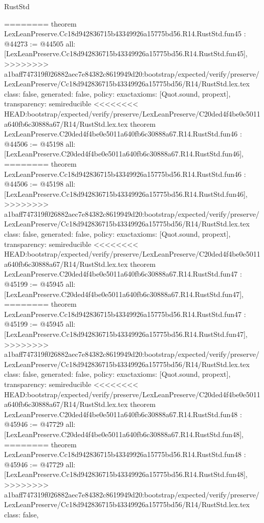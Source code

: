 \begin{lexlean}{RustStd}
\begin{coremodule}
{\begin{coremodule}
{{{{{{{{{{{{{{{{{{{{{{{{{{{{{{{{{{{{{{{{{{{{{{{{========
theorem LexLeanPreserve.Cc18d942836715b43349926a15775bd56.R14.RustStd.fun45 : @44273 := @44505 {
  all: [LexLeanPreserve.Cc18d942836715b43349926a15775bd56.R14.RustStd.fun45],
>>>>>>>> a1baff747319f026882aec7e84382c8619949d20:bootstrap/expected/verify/preserve/LexLeanPreserve/Cc18d942836715b43349926a15775bd56/R14/RustStd.lex.tex
  class: false,
  generated: false,
  policy: exact{axioms: [Quot.sound, propext]},
  transparency: semireducible
}
<<<<<<<< HEAD:bootstrap/expected/verify/preserve/LexLeanPreserve/C20ded4f4be0e5011a640fb6c30888a67/R14/RustStd.lex.tex
theorem LexLeanPreserve.C20ded4f4be0e5011a640fb6c30888a67.R14.RustStd.fun46 : @44506 := @45198 {
  all: [LexLeanPreserve.C20ded4f4be0e5011a640fb6c30888a67.R14.RustStd.fun46],
========
theorem LexLeanPreserve.Cc18d942836715b43349926a15775bd56.R14.RustStd.fun46 : @44506 := @45198 {
  all: [LexLeanPreserve.Cc18d942836715b43349926a15775bd56.R14.RustStd.fun46],
>>>>>>>> a1baff747319f026882aec7e84382c8619949d20:bootstrap/expected/verify/preserve/LexLeanPreserve/Cc18d942836715b43349926a15775bd56/R14/RustStd.lex.tex
  class: false,
  generated: false,
  policy: exact{axioms: [Quot.sound, propext]},
  transparency: semireducible
}
<<<<<<<< HEAD:bootstrap/expected/verify/preserve/LexLeanPreserve/C20ded4f4be0e5011a640fb6c30888a67/R14/RustStd.lex.tex
theorem LexLeanPreserve.C20ded4f4be0e5011a640fb6c30888a67.R14.RustStd.fun47 : @45199 := @45945 {
  all: [LexLeanPreserve.C20ded4f4be0e5011a640fb6c30888a67.R14.RustStd.fun47],
========
theorem LexLeanPreserve.Cc18d942836715b43349926a15775bd56.R14.RustStd.fun47 : @45199 := @45945 {
  all: [LexLeanPreserve.Cc18d942836715b43349926a15775bd56.R14.RustStd.fun47],
>>>>>>>> a1baff747319f026882aec7e84382c8619949d20:bootstrap/expected/verify/preserve/LexLeanPreserve/Cc18d942836715b43349926a15775bd56/R14/RustStd.lex.tex
  class: false,
  generated: false,
  policy: exact{axioms: [Quot.sound, propext]},
  transparency: semireducible
}
<<<<<<<< HEAD:bootstrap/expected/verify/preserve/LexLeanPreserve/C20ded4f4be0e5011a640fb6c30888a67/R14/RustStd.lex.tex
theorem LexLeanPreserve.C20ded4f4be0e5011a640fb6c30888a67.R14.RustStd.fun48 : @45946 := @47729 {
  all: [LexLeanPreserve.C20ded4f4be0e5011a640fb6c30888a67.R14.RustStd.fun48],
========
theorem LexLeanPreserve.Cc18d942836715b43349926a15775bd56.R14.RustStd.fun48 : @45946 := @47729 {
  all: [LexLeanPreserve.Cc18d942836715b43349926a15775bd56.R14.RustStd.fun48],
>>>>>>>> a1baff747319f026882aec7e84382c8619949d20:bootstrap/expected/verify/preserve/LexLeanPreserve/Cc18d942836715b43349926a15775bd56/R14/RustStd.lex.tex
  class: false,
}}}}}}}}}}}}}}}}}}}}}}}}}}}}}}}}}}}}}}}}}}}}}}}}}}}}
\end{coremodule}}
\end{coremodule}
\end{lexlean}
